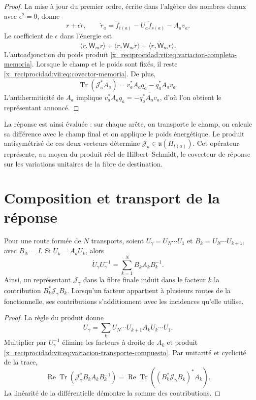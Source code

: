 \begin{proof}
La mise à jour du premier ordre, écrite dans l'algèbre des nombres duaux avec \(\epsilon^2=0\), donne
\[
 r+\epsilon\dot r,\qquad
 \dot r_a=\dot f_{t(a)}-U_a\dot f_{s(a)}-A_av_a.
\]
Le coefficient de \(\epsilon\) dans l'énergie est
\[
 \langle\dot r,\mathsf W_mr\rangle+
 \langle r,\mathsf W_m\dot r\rangle+
 \langle r,\dot{\mathsf W}_mr\rangle.
\]
L'autoadjonction du poids produit
\eqref{x_reciprocidad:vii:eq:variacion-completa-memoria}. Lorsque le champ et le poids sont fixés, il reste
\eqref{x_reciprocidad:vii:eq:covector-memoria}. De plus,
\[
 \operatorname{Tr}(\mathcal J_a^*A_a)
 =v_a^*A_aq_a-q_a^*A_av_a.
\]
L'antihermiticité de \(A_a\) implique
\(v_a^*A_aq_a=-\overline{q_a^*A_av_a}\), d'où l'on obtient
le représentant annoncé.
\end{proof}

La réponse est ainsi évaluée : sur chaque arête, on transporte le champ, on calcule sa différence avec le champ final et on applique le poids énergétique. Le produit antisymétrisé de ces deux vecteurs détermine \(\mathcal J_a\in\mathfrak u(H_{t(a)})\). Cet opérateur représente, au moyen du produit réel de Hilbert--Schmidt, le covecteur de réponse sur les variations unitaires de la fibre de destination.

\section{Composition et transport de la réponse}
\label{x_reciprocidad:vii:subsec:composicion-respuesta}

\begin{proposition}
\label{x_reciprocidad:vii:prop:composicion-respuesta}
Pour une route formée de \(N\) transports, soient
\(U_\gamma=U_N\cdots U_1\) et
\(B_k=U_N\cdots U_{k+1}\), avec \(B_N=I\).
Si \(\dot U_k=A_kU_k\), alors
\begin{equation}
 \dot U_\gamma U_\gamma^{-1}
 =\sum_{k=1}^N B_kA_kB_k^{-1}.
 \label{x_reciprocidad:vii:eq:variacion-transporte-compuesto}
\end{equation}
Ainsi, un représentant \(\mathcal J_\gamma\) dans la fibre finale
induit dans le facteur \(k\) la contribution
\(B_k^*\mathcal J_\gamma B_k\). Lorsqu'un facteur appartient à plusieurs
routes de la fonctionnelle, ses contributions s'additionnent avec les incidences
qu'elle utilise.
\end{proposition}

\begin{proof}
La règle du produit donne
\[
 \dot U_\gamma=\sum_k
 U_N\cdots U_{k+1}A_kU_k\cdots U_1.
\]
Multiplier par \(U_\gamma^{-1}\) élimine les facteurs à droite
de \(A_k\) et produit \eqref{x_reciprocidad:vii:eq:variacion-transporte-compuesto}.
Par unitarité et cyclicité de la trace,
\[
 \operatorname{Re}\operatorname{Tr}
   (\mathcal J_\gamma^*B_kA_kB_k^{-1})
 =\operatorname{Re}\operatorname{Tr}
   ((B_k^*\mathcal J_\gamma B_k)^*A_k).
\]
La linéarité de la différentielle démontre la somme des contributions.
\end{proof}

